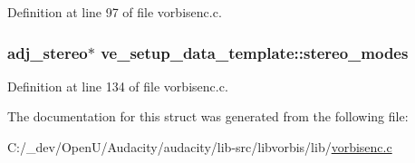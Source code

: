 Definition at line 97 of file vorbisenc.\+c.

\subsubsection[{\texorpdfstring{stereo\+\_\+modes}{stereo_modes}}]{ {\bf adj\+\_\+stereo}$\ast$ ve\+\_\+setup\+\_\+data\+\_\+template\+::stereo\+\_\+modes}\hypertarget{structve__setup__data__template_a70fda50f0f12a99eb1149f6ff3f4ae12}{}\label{structve__setup__data__template_a70fda50f0f12a99eb1149f6ff3f4ae12}


Definition at line 134 of file vorbisenc.\+c.



The documentation for this struct was generated from the following file\+:\begin{DoxyCompactItemize}
\item 
C\+:/\+\_\+dev/\+Open\+U/\+Audacity/audacity/lib-\/src/libvorbis/lib/\hyperlink{vorbisenc_8c}{vorbisenc.\+c}\end{DoxyCompactItemize}
